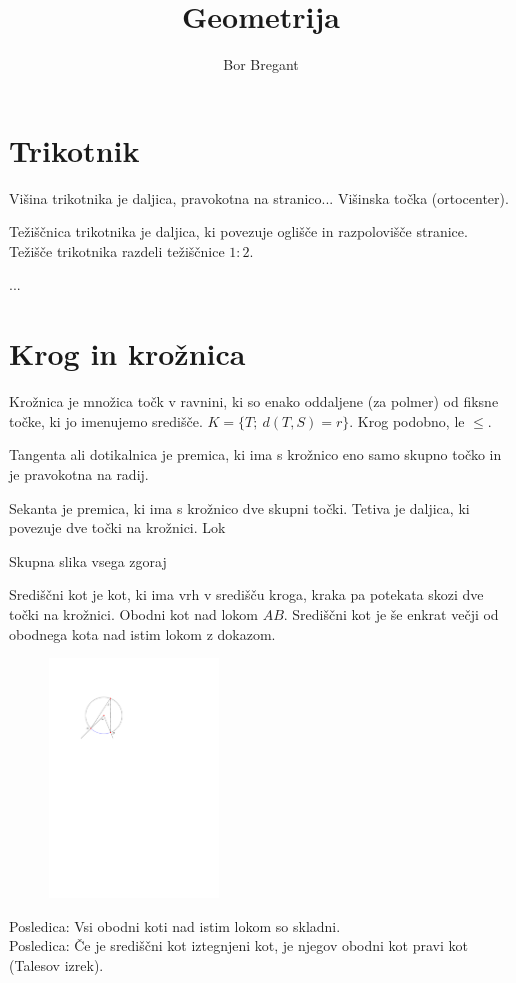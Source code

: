 \documentclass{article}
\title{Geometrija}
\author{Bor Bregant}
\date{\vspace{-5ex}}
\begin{document}
\maketitle

\section{Trikotnik}

Višina trikotnika je daljica, pravokotna na stranico... Višinska točka (ortocenter).

Težiščnica trikotnika je daljica, ki povezuje oglišče in razpolovišče stranice. Težišče trikotnika razdeli težiščnice $1:2$.

...

\section{Krog in krožnica}

Krožnica je množica točk v ravnini, ki so enako oddaljene (za polmer) od fiksne točke, ki jo imenujemo središče.  $K = \{T;\ d(T,S)=r\}$. Krog podobno, le $\leq$.

Tangenta ali dotikalnica je premica, ki ima s krožnico eno samo skupno točko in je pravokotna na radij.

Sekanta je premica, ki ima s krožnico dve skupni točki. Tetiva je daljica, ki povezuje dve točki na krožnici. Lok

Skupna slika vsega zgoraj

Središčni kot je kot, ki ima vrh v središču kroga, kraka pa potekata skozi dve točki na krožnici. Obodni kot nad lokom $AB$. Središčni kot je še enkrat večji od obodnega kota nad istim lokom z dokazom.\\
\begin{figure}[H]
    \includegraphics[width=0.4\textwidth]{srediscni_kot.pdf}
    \centering
\end{figure}
Posledica: Vsi obodni koti nad istim lokom so skladni.\\
Posledica: Če je središčni kot iztegnjeni kot, je njegov obodni kot pravi kot (Talesov izrek).
\end{document}
